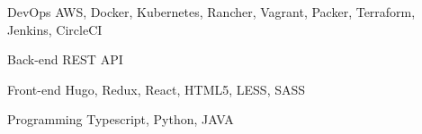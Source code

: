 

\begin{cvskills}

  \cvskill
    {DevOps} %
    {AWS, Docker, Kubernetes, Rancher, Vagrant, Packer, Terraform, Jenkins, CircleCI} %

  \cvskill
    {Back-end} %
    {REST API} %

  \cvskill
    {Front-end} %
    {Hugo, Redux, React, HTML5, LESS, SASS} %

  \cvskill
    {Programming} %
    {Typescript, Python, JAVA} %

\end{cvskills}
